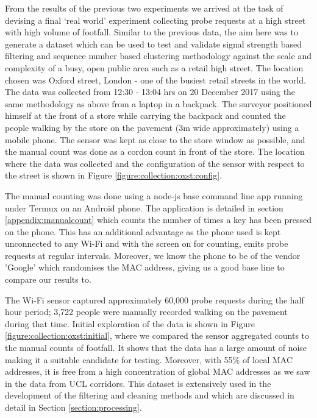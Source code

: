 From the results of the previous two experiments we arrived at the task of devising a final `real world' experiment collecting probe requests at a high street with high volume of footfall.
Similar to the previous data, the aim here was to generate a dataset which can be used to test and validate signal strength based filtering and sequence number based clustering methodology against the scale and complexity of a busy, open public area such as a retail high street.
The location chosen was Oxford street, London - one of the busiest retail streets in the world.
The data was collected from 12:30 - 13:04 hrs on 20 December 2017 using the same methodology as above from a laptop in a backpack.
The surveyor positioned himself at the front of a store while carrying the backpack and counted the people walking by the store on the pavement (3m wide approximately) using a mobile phone.
The sensor was kept as close to the store window as possible, and the manual count was done as a cordon count in front of the store.
The location where the data was collected and the configuration of the sensor with respect to the street is shown in Figure \ref{figure:collection:oxst:config}.

The manual counting was done using a node-js base command line app running under Termux on an Android phone.
The application is detailed in section \ref{appendix:manualcount} which counts the number of times a key has been pressed on the phone.
This has an additional advantage as the phone used is kept unconnected to any Wi-Fi and with the screen on for counting, emits probe requests at regular intervals.
Moreover, we know the phone to be of the vendor 'Google' which randomises the MAC address, giving us a good base line to compare our results to.

The Wi-Fi sensor captured approximately 60,000 probe requests during the half hour period; 3,722 people were manually recorded walking on the pavement during that time.
Initial exploration of the data is shown in Figure \ref{figure:collection:oxst:initial}, where we compared the sensor aggregated counts to the manual counts of footfall.
It shows that the data has a large amount of noise making it a suitable candidate for testing. 
Moreover, with 55\% of local MAC addresses, it is free from a high concentration of global MAC addresses as we saw in the data from UCL corridors.
This dataset is extensively used in the development of the filtering and cleaning methods and which are discussed in detail in Section \ref{section:processing}.

